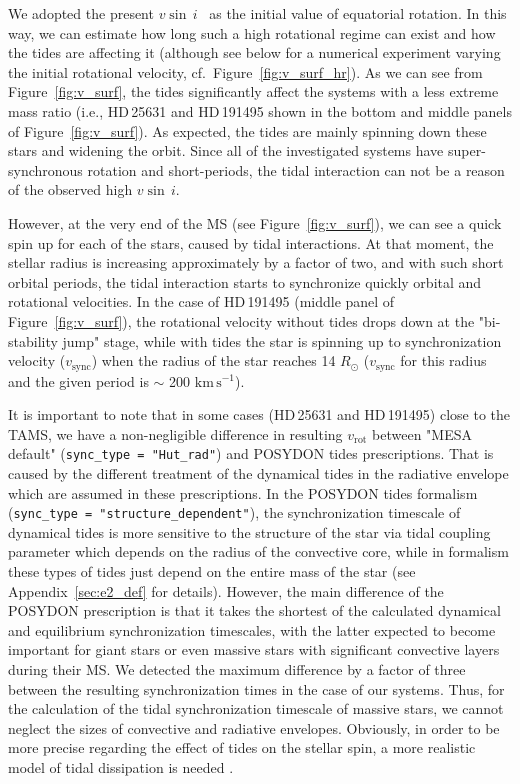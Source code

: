 \documentclass{aa}
\newcommand{\kms}{$\mathrm{km\,s^{-1}}$}
\newcommand{\vsini} {$v\sin\,i$}
\DeclareRobustCommand{\Figref}[1]{Figure~\ref{#1}}
\DeclareRobustCommand{\Appref}[1]{Appendix~\ref{#1}}
\begin{document}
We adopted the present \vsini~ as the initial value of equatorial
rotation. In this way, we can estimate how long such a high rotational
regime can exist and how the tides are affecting it (although see
below for a numerical experiment varying the initial rotational
velocity, cf.~\Figref{fig:v_surf_hr}). As we can see
from \Figref{fig:v_surf}, the tides significantly affect the systems
with a less extreme mass ratio (i.e., HD\,25631 and HD\,191495
shown in the bottom and middle panels of \Figref{fig:v_surf}).
As expected, the tides are mainly spinning down these stars and widening the orbit.
Since all of the investigated systems have super-synchronous rotation and short-periods, the tidal interaction can not be a reason of the
observed high \vsini.

However, at the very end of the MS
(see \Figref{fig:v_surf}), we can see a quick spin up for each of
the stars, caused by tidal interactions. At that moment, the stellar
radius is increasing approximately by a factor of two, and with
such short orbital periods, the tidal interaction starts to
synchronize quickly orbital and rotational velocities. In the case of
HD\,191495 (middle panel of \Figref{fig:v_surf}), the rotational
velocity without tides drops down at the "bi-stability jump" stage,
while with tides the star is spinning up to synchronization velocity
($v_\mathrm{sync}$) when the radius of the star reaches 14
$R_{\odot}$ ($v_\mathrm{sync}$ for this radius and the
given period is $\sim$ 200 \kms).


It is important to note that in some cases (HD\,25631 and HD\,191495) close to the TAMS, we have a non-negligible difference in resulting $v_\mathrm{rot}$ between "MESA default" (\texttt{sync\_type = "Hut\_rad"}) and POSYDON tides prescriptions.
That is caused by the different treatment of the dynamical tides in the radiative envelope which are assumed in these prescriptions.
In the POSYDON tides formalism (\texttt{sync\_type = "structure\_dependent"}), the synchronization timescale of dynamical tides is more sensitive to the structure of the star via tidal coupling parameter \citep[often called $E_{2}$, see Section 3 in][]{Qin_2018} which depends on the radius of the convective core, while in \citet{Hut_1980,Hurley_2002} formalism these types of tides just depend on the entire mass of the star (see \Appref{sec:e2_def} for details).
However, the main difference of the POSYDON prescription is that it takes the shortest of the calculated dynamical and equilibrium synchronization timescales, with the latter expected to become important for giant stars or even massive stars with significant convective layers during their MS.
We detected the maximum difference by a factor of three between the resulting synchronization times in the case of our systems.
Thus, for the calculation of the tidal synchronization timescale of massive stars, we cannot neglect the sizes of convective and radiative envelopes.
Obviously, in order to be more precise regarding the effect of tides on the stellar spin, a more realistic model of tidal dissipation is needed \citep[especially while investigating the spin distribution of black holes, see e.g.][]{Bavera_2020,Ma_2023}.
\end{document}
